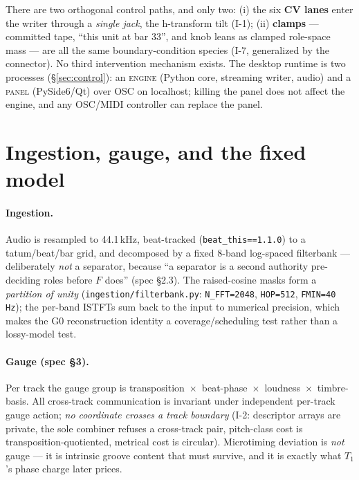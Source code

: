 \documentclass[11pt]{article}
\newcommand{\code}[1]{\texttt{\small #1}}
\begin{document}
There are two orthogonal control paths, and only two: (i) the six \textbf{CV
lanes} enter the writer through a \emph{single jack}, the h-transform tilt (I-1);
(ii) \textbf{clamps} --- committed tape, ``this unit at bar 33'', and knob leans
as clamped role-space mass --- are all the same boundary-condition species (I-7,
generalized by the connector). No third intervention mechanism exists. The
desktop runtime is two processes (\S\ref{sec:control}): an \textsc{engine} (Python
core, streaming writer, audio) and a \textsc{panel} (PySide6/Qt) over OSC on
localhost; killing the panel does not affect the engine, and any OSC/MIDI
controller can replace the panel.

\section{Ingestion, gauge, and the fixed model}

\paragraph{Ingestion.} Audio is resampled to 44.1\,kHz, beat-tracked
(\code{beat\_this==1.1.0}) to a tatum/beat/bar grid, and decomposed by a fixed
8-band log-spaced filterbank --- deliberately \emph{not} a separator, because
``a separator is a second authority pre-deciding roles before $F$ does'' (spec
\S2.3). The raised-cosine masks form a \emph{partition of unity}
(\code{ingestion/filterbank.py}: \code{N\_FFT=2048}, \code{HOP=512},
\code{FMIN=40\,Hz}); the per-band ISTFTs sum back to the input to numerical
precision, which makes the G0 reconstruction identity a coverage/scheduling test
rather than a lossy-model test.

\paragraph{Gauge (spec \S3).} Per track the gauge group is
transposition~$\times$~beat-phase~$\times$~loudness~$\times$~timbre-basis. All
cross-track communication is invariant under independent per-track gauge action;
\emph{no coordinate crosses a track boundary} (I-2: descriptor arrays are private,
the sole combiner refuses a cross-track pair, pitch-class cost is
transposition-quotiented, metrical cost is circular). Microtiming deviation is
\emph{not} gauge --- it is intrinsic groove content that must survive, and it is
exactly what $T_1$'s phase charge later prices.
\end{document}
